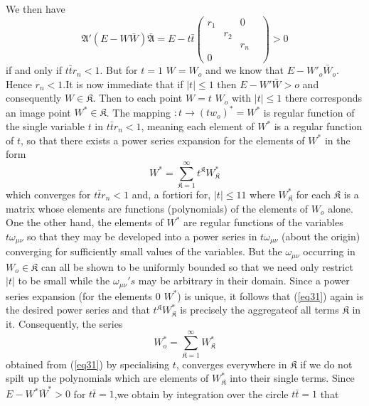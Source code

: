   We then have
$$
\mathfrak{A}' (E -W \bar{W}) \bar{\mathfrak{A}} = E - t
\bar{t} \begin{pmatrix}  r_1 &  & 0 & \\ & r_2 & & \\ & &  r_n \\ 0 &
  & & \end{pmatrix} >0 
$$
if and only if $t \bar{t} r_n < 1$. But for $t = 1$ $W =W_o$ and we know
that $E -W'_o \bar{W}_o$. Hence $r_n < 1$.It is now immediate that if
$|t| \le 1$ then $E-W'\bar{W} > o$ and consequently $W \in
\mathfrak{K}$. Then to each point $W=t$ $W_o$ with $|t| \le 1$ there
corresponds an image point $W^* \in \mathfrak{K}$. The mapping
$: t \to (t w_o)^* = W^*$ is regular function of the single variable
$t$ in $t \bar{t} r_n < 1$, meaning each element of $W^*$ is a regular
function of $t$, so that there exists a power series expansion for the
elements of $W^*$ in the form  
\begin{equation*}
W^* = \sum_{\mathfrak{K} = 1}^\infty t^\mathfrak{K}
W^*_{\mathfrak{K}} \tag{31}\label{eq31}  
\end{equation*}
which converges for $t \bar{t} r_n < 1$ and, a fortiori for, $|t| \leq
1 1$ where $W^*_\mathfrak{K}$ for each $\mathfrak{K}$ is a matrix
whose elements are functions (polynomials) of the elements of $W_o$
alone. One the other hand, the elements of $W^*$ are regular functions
of the variables $t \omega _{\mu \nu}$ so that they may be developed
into a power series in $t \omega _{\mu \nu}$ (about the origin)
converging for sufficiently small values of the variables. But the
$\omega_{\mu \nu}$ occurring in $W_o \in \mathfrak{K}$ can all be
shown to be uniformly bounded so that we need only restrict $|t|$ to
be small while the $\omega _{\mu \nu}'s$ may be arbitrary in
their domain. Since a power series expansion (for the elements 0
$W^*$) is unique, it follows that (\ref{eq31})  again is the desired power
series and that $t^{\mathfrak{K}}W^*_{\mathfrak{K}}$ is precisely the
aggregate\pageoriginale of all terms $\mathfrak{K}$ in
it. Consequently, the series   
\begin{equation*}
W^*_o = \sum_{\mathfrak{K} = 1}^\infty W^*_\mathfrak{K} \tag{32}\label{eq32}  
\end{equation*}
obtained from (\ref{eq31}) by specialising $t$, converges everywhere in
$\mathfrak{K}$ if we do not spilt up the polynomials which are
elements of $W^*_\mathfrak{K}$ into their single terms. Since $E -W^*
\bar{W}^* > 0$ for $t \bar{t} = 1$,we obtain by integration over the
circle $t\bar{t} = 1$ that  
